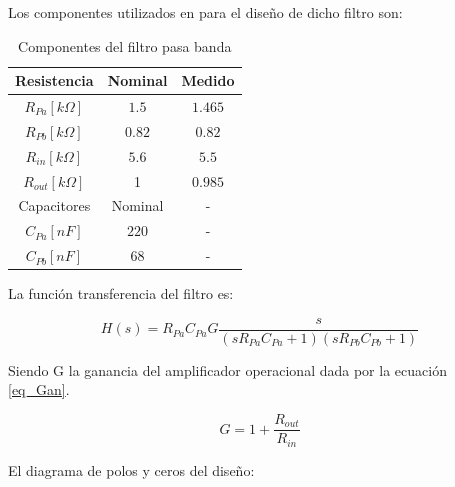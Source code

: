 Los componentes utilizados en para el diseño de dicho filtro son:

\begin{table}[H]
    \centering
    \label{tab:mi_tabla}
    \begin{tabular}{|c|c|c|}
        \hline
        Resistencia & Nominal & Medido\\
        \hline
        $R_{Pa}[k\Omega]$ & $1.5$ & $1.465$ \\
        \hline
        $R_{Pb}[k\Omega]$ & $0.82$ & $0.82$ \\
        \hline
        $R_{in}[k\Omega]$ & $5.6$ & $5.5$\\
        \hline
        $R_{out}[k\Omega]$ & 1 & $0.985$ \\
        \hline
        Capacitores & Nominal & -\\
        \hline
        $C_{Pa}[nF]$ & $220$ &-\\
        \hline
        $C_{Pb}[nF]$ & $68$ & -\\
        \hline
    \end{tabular}
    
        \caption{Componentes del filtro pasa banda}
    \label{tab:Comp_filtro}
\end{table}

La función transferencia del filtro es:

\begin{equation}
H(s) = R_{Pa} C_{Pa} G
\frac{s}
{(s R_{Pa} C_{Pa} + 1)(s R_{Pb} C_{Pb} + 1)}
\end{equation}

Siendo G la ganancia del amplificador operacional dada por la ecuación \ref{eq_Gan}.

\begin{equation}
    G = 1 + \frac{R_{out}}{R_{in}}
    \label{eq_Gan}
\end{equation}

 El diagrama de polos y ceros del diseño:

